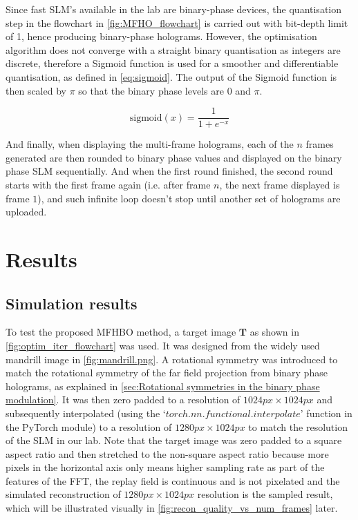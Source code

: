
	Since fast SLM's available in the lab are binary-phase devices, the quantisation step in the flowchart in \cref{fig:MFHO_flowchart} is carried out with bit-depth limit of 1, hence producing binary-phase holograms. However, the optimisation algorithm does not converge with a straight binary quantisation as integers are discrete, therefore a Sigmoid function \cite{Bacaer2011} is used for a smoother and differentiable quantisation, as defined in \cref{eq:sigmoid}. The output of the Sigmoid function is then scaled by $\pi$ so that the binary phase levels are $0$ and $\pi$.

	\begin{equation}
		\mathrm{sigmoid}(x)=\frac{1}{1+e^{-x}}
		\label{eq:sigmoid}
	\end{equation}

	And finally, when displaying the multi-frame holograms, each of the $n$ frames generated are then rounded to binary phase values and displayed on the binary phase SLM sequentially. And when the first round finished, the second round starts with the first frame again (i.e. after frame $n$, the next frame displayed is frame $1$), and such infinite loop doesn't stop until another set of holograms are uploaded.

\section{Results}

\subsection{Simulation results}
	To test the proposed MFHBO method, a target image $\textbf{T}$ as shown in \cref{fig:optim_iter_flowchart} was used. It was designed from the widely used mandrill image \cite{MANDRILL_REF} in \cref{fig:mandrill.png}. A rotational symmetry was introduced to match the rotational symmetry of the far field projection from binary phase holograms, as explained in \cref{sec:Rotational symmetries in the binary phase modulation}. It was then zero padded to a resolution of $1024px\times 1024px$ and subsequently interpolated (using the `$torch.nn.functional.interpolate$' function in the PyTorch module\cite{Paszke2019}) to a resolution of $1280px\times 1024px$ to match the resolution of the SLM in our lab. Note that the target image was zero padded to a square aspect ratio and then stretched to the non-square aspect ratio because more pixels in the horizontal axis only means higher sampling rate as part of the features of the FFT, the replay field is continuous and is not pixelated and the simulated reconstruction of $1280px\times 1024px$ resolution is the sampled result, which will be illustrated visually in \cref{fig:recon_quality_vs_num_frames} later.

